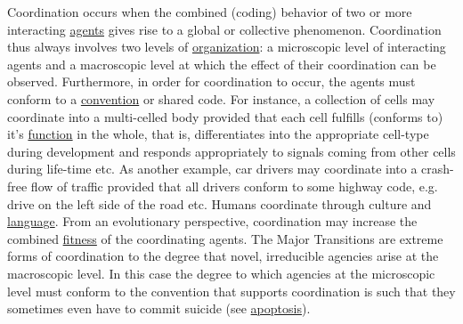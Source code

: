 \documentclass[12pt]{article}
\begin{document}
Coordination occurs when the combined (coding) behavior of two or
more interacting \hyperlink{agent}{agents} gives rise to a global or
collective phenomenon. Coordination thus always involves two levels of
\hyperlink{organization}{organization}: a microscopic level of
interacting agents and a macroscopic level at which the effect of
their coordination can be observed. Furthermore, in order for
coordination to occur, the agents must conform to a
\hyperlink{convention}{convention} or shared code. For instance, a
collection of cells may coordinate into a multi-celled body provided
that each cell fulfills (conforms to) it's
\hyperlink{function}{function} in the whole, that is, differentiates
into the appropriate cell-type during development and responds
appropriately to signals coming from other cells during life-time
etc. As another example, car drivers may coordinate into a crash-free
flow of traffic provided that all drivers conform to some highway
code, e.g. drive on the left side of the road etc. Humans coordinate
through culture and \hyperlink{language}{language}. From an
evolutionary perspective, coordination may increase the combined
\hyperlink{fitness}{fitness} of the coordinating agents. The Major
Transitions are extreme forms of coordination to the degree that
novel, irreducible agencies arise at the macroscopic level. In this
case the degree to which agencies at the microscopic level must
conform to the convention that supports coordination is such that they
sometimes even have to commit suicide (see \hyperlink{apoptosis}{apoptosis}).
\end{document}
